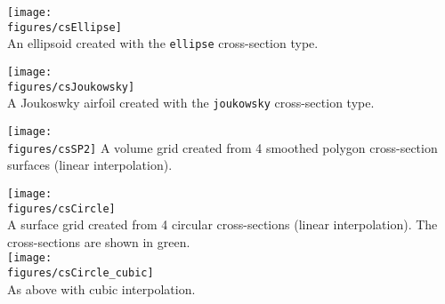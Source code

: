 \noindent
\begin{minipage}{.5\linewidth}
  \begin{center}
   \texttt{[image: \\figures/csEllipse]} \\
  {An ellipsoid created with the {\tt ellipse} cross-section type.}
  \end{center}
\end{minipage}
\begin{minipage}{.5\linewidth}
  \begin{center}
   \texttt{[image: \\figures/csJoukowsky]} \\
  {A Joukoswky airfoil created with the {\tt joukowsky} cross-section type.}
  \end{center}
\end{minipage}
\begin{minipage}{.5\linewidth}
  \begin{center}
   \texttt{[image: \\figures/csSP2]}
  {A volume grid created from 4 smoothed polygon cross-section surfaces (linear interpolation).}
  \end{center}
\end{minipage}


\noindent
\begin{minipage}{.4\linewidth}
{\footnotesize
{}
}
\end{minipage}\hfill
\begin{minipage}{.6\linewidth}
  \begin{center}
   \texttt{[image: \\figures/csCircle]} \\
  {A surface grid created from 4 circular cross-sections (linear interpolation). 
   The cross-sections are shown in green.} \\
   \texttt{[image: \\figures/csCircle\_cubic]} \\
  {As above with cubic interpolation.}
  \end{center}
\end{minipage}



